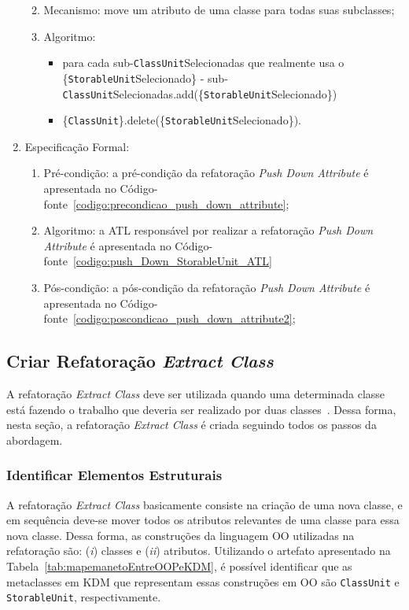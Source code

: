 \begin{enumerate}
\begin{enumerate}
\begin{itemize}
			    \end{itemize}
			\item Mecanismo: move um atributo de uma classe para todas suas subclasses;
			\item Algoritmo: 
			    \begin{itemize}
			        \item para cada sub-\texttt{ClassUnit}Selecionadas que realmente usa o \{\texttt{StorableUnit}Selecionado\} - sub-\texttt{ClassUnit}Selecionadas.add(\{\texttt{StorableUnit}Selecionado\})
			        \item \{\texttt{ClassUnit}\}.delete(\{\texttt{StorableUnit}Selecionado\}). 
			    \end{itemize} 
	    \end{enumerate}
		\item Especificação Formal:
		\begin{enumerate}
			\item Pré-condição: a pré-condição da refatoração \textit{Push Down Attribute} é apresentada no Código-fonte~\ref{codigo:precondicao_push_down_attribute};
			\item Algoritmo: a ATL responsável por realizar a refatoração \textit{Push Down Attribute} é apresentada no Código-fonte~\ref{codigo:push_Down_StorableUnit_ATL}
			\item Pós-condição: a pós-condição da refatoração \textit{Push Down Attribute} é apresentada no Código-fonte~\ref{codigo:poscondicao_push_down_attribute2};
		\end{enumerate}
	\end{enumerate}		
	
	
	
\subsection{Criar Refatoração \textit{Extract Class}}
A refatoração \textit{Extract Class} deve ser utilizada quando uma determinada classe está fazendo o trabalho que deveria ser realizado por duas classes~\cite{Fowler1999}. Dessa forma, nesta seção, a refatoração \textit{Extract Class} é criada seguindo todos os passos da abordagem. 

\subsubsection{Identificar Elementos Estruturais}

A refatoração \textit{Extract Class} basicamente consiste na criação de uma nova classe, e em sequência deve-se mover todos os atributos relevantes de uma classe para essa nova classe. Dessa forma, as construções da linguagem OO utilizadas na refatoração são: (\textit{i}) classes e (\textit{ii}) atributos. Utilizando o artefato apresentado na Tabela~\ref{tab:mapemanetoEntreOOPeKDM}, é possível identificar que as metaclasses em KDM que representam essas construções em OO são \texttt{ClassUnit} e \texttt{StorableUnit}, respectivamente.

